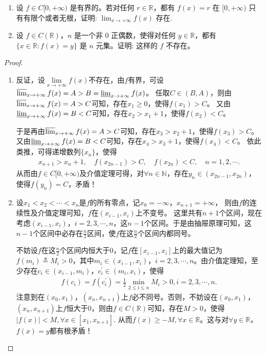 \documentclass[../../main.tex]{subfiles}%
\begin{document}
\begin{example}
\begin{enumerate}
\item 设 \(f\in C[0,+\infty)\) 是有界的。若对任何 \(r\in\mathbb{R}\)，都有 \(f(x)=r\) 在 \([0,+\infty)\) 只有有限个或者无根，证明:
$\lim_{x \to +\infty} f(x) \text{ 存在}.$

\item 设 \(f\in C(\mathbb{R})\)，\(n\) 是一个非 \(0\) 正偶数，使得对任何 \(y\in\mathbb{R}\)，都有 \(\{x\in\mathbb{R}:f(x)=y\}\) 是 \(n\) 元集。证明: 这样的 \(f\) 不存在。 
\end{enumerate}
\end{example}
\begin{proof}
\begin{enumerate}
\item 反证，设\(\lim\limits_{x \to +\infty} f(x)\)不存在，由\(f\)有界，可设\(\varlimsup_{x \to +\infty} f(x)=A > B=\varliminf_{x \to +\infty} f(x)\)。
任取\(C\in (B,A)\)，则由\(\varlimsup_{x \to +\infty} f(x)=A > C\)可知，存在\(x_1\geqslant 0\)，使得\(f(x_1)>C\)。
又由\(\varliminf_{x \to +\infty} f(x)=B < C\)可知，存在\(x_2 > x_1 + 1\)，使得\(f(x_2)<C\)。

于是再由\(\varlimsup_{x \to +\infty} f(x)=A > C\)可知，存在\(x_3 > x_2 + 1\)，使得\(f(x_3)>C\)。
又由\(\varliminf_{x \to +\infty} f(x)=B < C\)可知，存在\(x_4 > x_3 + 1\)，使得\(f(x_4)<C\)。
依此类推，可得递增数列\(\{x_n\}\)，使得
\begin{align*}
x_{n + 1} > x_n + 1, \quad f(x_{2n - 1}) > C, \quad f(x_{2n}) < C, \quad n = 1,2,\cdots.
\end{align*}
从而由\(f\in C[0,+\infty)\)及介值定理可得，对\(\forall n\in\mathbb{N}\)，存在\(y_n\in (x_{2n - 1},x_{2n})\)，使得\(f(y_n)=C\)，矛盾！ 

\item 设\(x_1<x_2<\cdots <x_n\)是\(f\)的所有零点，记\(x_0 = -\infty\)，\(x_{n + 1} = +\infty\)，
则由\(f\)的连续性及介值定理可知，\(f\)在\(( x_{i - 1},x_i )\)上不变号。
这里共有\(n + 1\)个区间，现在考虑\(( x_{i - 1},x_i )\)，\(i = 2,3,\cdots,n\)，这\(n - 1\)个区间。于是由抽屉原理可知，这\(n - 1\)个区间中必存在\(\frac{n}{2}\)区间，使\(f\)在这\(\frac{n}{2}\)个区间内都同号。

不妨设\(f\)在这\(\frac{n}{2}\)个区间内恒大于\(0\)，记\(f\)在\([ x_{i - 1},x_i ]\)上的最大值记为\(f( m_i ) \triangleq M_i>0\)，其中\(m_i\in ( x_{i - 1},x_i )\)，\(i = 2,3,\cdots,n\)。由介值定理知，至少存在\(c_i\in ( x_{i - 1},m_i )\)，\(c_{i}^{\prime}\in ( m_i,x_i )\)，使得
\begin{align*}
f( c_i ) =f( c_{i}^{\prime} ) =\frac{1}{2}\underset{2\leqslant  i\leqslant  n}{\min}M_i>0,i = 2,3,\cdots,n.
\end{align*}
注意到在\(( x_0,x_1 )\)，\(( x_n,x_{n + 1} )\)上\(f\)必不同号。否则，不妨设在\(( x_0,x_1 )\)，\(( x_n,x_{n + 1} )\)上\(f\)恒大于\(0\)，则由\(f\in C( \mathbb{R} )\)可知，存在\(M>0\)，使得
\(\left| f( x ) \right|<M,\forall x\in [ x_1,x_{n + 1} ].\)
从而\(f( x ) \geqslant -M,\forall x\in \mathbb{R} \)。这与对\(\forall y\in \mathbb{R} \)，\(f( x ) =y\)都有根矛盾！


\end{enumerate}
\end{proof}
\end{document}
